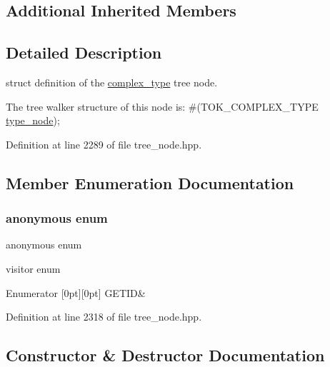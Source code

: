 \subsection*{Additional Inherited Members}


\subsection{Detailed Description}
struct definition of the \hyperlink{structcomplex__type}{complex\+\_\+type} tree node. 

The tree walker structure of this node is\+: \#(T\+O\+K\+\_\+\+C\+O\+M\+P\+L\+E\+X\+\_\+\+T\+Y\+PE \hyperlink{structtype__node}{type\+\_\+node}); 

Definition at line 2289 of file tree\+\_\+node.\+hpp.



\subsection{Member Enumeration Documentation}
\mbox{\label{structcomplex__type_ac3b732d0d04733e716d966b9a2cb7d85}} 
\subsubsection{\texorpdfstring{anonymous enum}{anonymous enum}}
{\footnotesize\ttfamily anonymous enum}



visitor enum 

\begin{DoxyEnumFields}{Enumerator}
[0pt][0pt]{}\mbox{\label{structcomplex__type_ac3b732d0d04733e716d966b9a2cb7d85a75dfdddc1ccf4e24be1dc6577f8e73be}} 
G\+E\+T\+ID&\\
\hline

\end{DoxyEnumFields}


Definition at line 2318 of file tree\+\_\+node.\+hpp.



\subsection{Constructor \& Destructor Documentation}
\mbox{\label{structcomplex__type_a85d5884d2d5ff6d5e18a97fbbe69f4d2}} 
